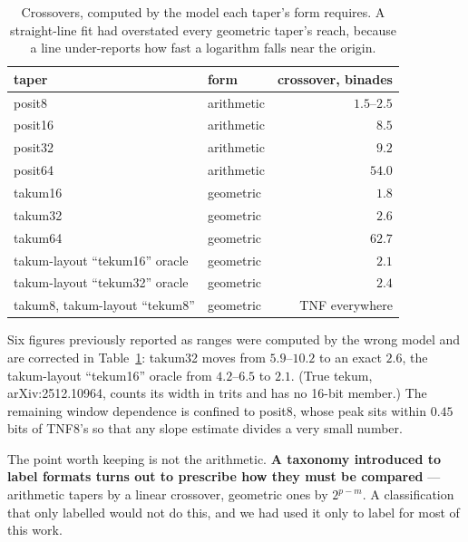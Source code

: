 \documentclass[11pt]{article}
\theoremstyle{definition}
\begin{document}
\begin{table}[t]\centering
\caption{Crossovers, computed by the model each taper's form requires. A
straight-line fit had overstated every geometric taper's reach, because a line
under-reports how fast a logarithm falls near the origin.}
\label{tab:crosscorrected}
\begin{tabular}{llr}
\toprule
taper & form & crossover, binades \\
\midrule
posit8 & arithmetic & $1.5$--$2.5$ \\
posit16 & arithmetic & $8.5$ \\
posit32 & arithmetic & $9.2$ \\
posit64 & arithmetic & $54.0$ \\
takum16 & geometric & $\mathbf{1.8}$ \\
takum32 & geometric & $\mathbf{2.6}$ \\
takum64 & geometric & $\mathbf{62.7}$ \\
takum-layout ``tekum16'' oracle & geometric & $\mathbf{2.1}$ \\
takum-layout ``tekum32'' oracle & geometric & $\mathbf{2.4}$ \\
takum8, takum-layout ``tekum8'' & geometric & TNF everywhere \\
\bottomrule
\end{tabular}
\end{table}

Six figures previously reported as ranges were computed by the wrong model and
are corrected in Table~\ref{tab:crosscorrected}: takum32 moves from $5.9$--$10.2$ to an exact $2.6$, the
takum-layout ``tekum16'' oracle
from $4.2$--$6.5$ to $2.1$. (True tekum, arXiv:2512.10964, counts its width in
trits and has no 16-bit member.) The remaining window dependence is confined to
posit8, whose peak sits within $0.45$ bits of TNF8's so that any slope estimate
divides a very small number.

The point worth keeping is not the arithmetic. \textbf{A taxonomy introduced to label
formats turns out to prescribe how they must be compared} --- arithmetic tapers
by a linear crossover, geometric ones by $2^{p-m}$. A classification that only
labelled would not do this, and we had used it only to label for most of this
work.
\end{document}
